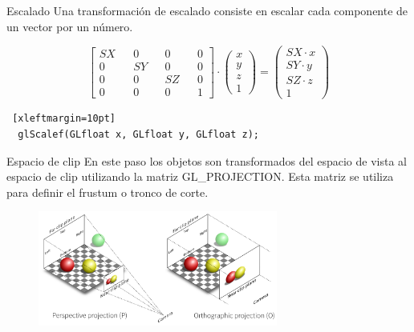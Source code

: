 \documentclass{beamer}
\begin{document}
\begin{frame}[fragile]{Escalado}
  Una transformación de escalado consiste en escalar cada componente de un vector por un número.
  
  \begin{minipage}{0.3\textwidth}
\end{minipage}
\begin{minipage}{0.69\textwidth}
  \[
  \begin{bmatrix}
    SX && 0 && 0 && 0\\
    0 && SY && 0 && 0\\
    0 && 0 && SZ && 0\\
    0 && 0 && 0 && 1
  \end{bmatrix}
  \cdot
  \begin{pmatrix}
    x \\ y \\ z \\ 1
  \end{pmatrix}
  =
  \begin{pmatrix}
    SX \cdot x \\
    SY \cdot y \\
    SZ \cdot z \\
    1
  \end{pmatrix}
  \]
\end{minipage}
\begin{lstlisting} [xleftmargin=10pt]
  glScalef(GLfloat x, GLfloat y, GLfloat z);
\end{lstlisting}
\end{frame}

\begin{frame}{Espacio de clip}
  En este paso los objetos son transformados del espacio de vista al espacio de clip utilizando la matriz GL\_PROJECTION. Esta matriz se utiliza para definir el frustum o tronco de corte.
  \begin{figure}[ht]
    \centering
    \includegraphics[width=0.7\textwidth]{img/projection}
  \end{figure}
\end{frame}
\end{document}
